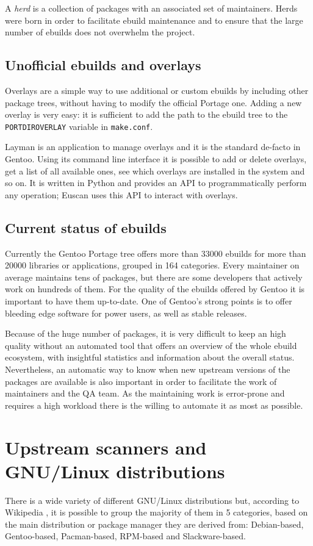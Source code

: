 A \emph{herd} is a collection of packages with an associated set of maintainers. Herds were born in order to facilitate ebuild maintenance and to ensure that the large number of ebuilds does not overwhelm the project.


\subsection{Unofficial ebuilds and overlays}
Overlays are a simple way to use additional or custom ebuilds by including other package trees, without having to modify the official Portage one. Adding a new overlay is very easy: it is sufficient to add the path to the ebuild tree to the \texttt{PORTDIR\textunderscore OVERLAY} variable in \texttt{make.conf}.

Layman is an application to manage overlays and it is the standard de-facto in Gentoo. Using its command line interface it is possible to add or delete overlays, get a list of all available ones, see which overlays are installed in the system and so on. It is written in Python and provides an API to programmatically perform any operation; Euscan uses this API to interact with overlays.


\subsection{Current status of ebuilds}
Currently the Gentoo Portage tree offers more than 33000 ebuilds for more than 20000 libraries or applications, grouped in 164 categories.
Every maintainer on average maintains tens of packages, but there are some developers that actively work on hundreds of them. For the quality of the ebuilds offered by Gentoo it is important to have them up-to-date. One of Gentoo's strong points is to offer bleeding edge software for power users, as well as stable releases.

Because of the huge number of packages, it is very difficult to keep an high quality without an automated tool that offers an overview of the whole ebuild ecosystem, with insightful statistics and information about the overall status. Nevertheless, an automatic way to know when new upstream versions of the packages are available is also important in order to facilitate the work of maintainers and the QA team.
As the maintaining work is error-prone and requires a high workload there is the willing to automate it as most as possible.


\section{Upstream scanners and GNU/Linux distributions}
There is a wide variety of different GNU/Linux distributions but, according to Wikipedia \cite{wikipedia_distros}, it is possible to group the majority of them in 5 categories, based on the main distribution or package manager they are derived from: Debian-based, Gentoo-based, Pacman-based, RPM-based and Slackware-based.

